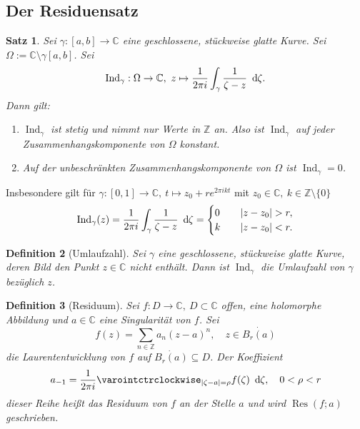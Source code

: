 \documentclass[a4paper,12pt]{article}
\theoremstyle{newthm}
\newtheorem{thm}{Satz}[subsection]
\theoremstyle{newdef}
\newtheorem{defn}[thm]{Definition}
\theoremstyle{newrem}
\newcommand{\Z}{\mathbb{Z}}
\newcommand{\C}{\mathbb{C}}
\renewcommand{\d}{\ \operatorname{d}\hspace{-2px}}
\newcommand{\Ind}[1]{\operatorname{Ind}_{#1}}
\newcommand{\Res}[2]{\operatorname{Res} \left( #1;#2 \right) }
\begin{document}
	
	\subsection{Der Residuensatz}
		
		\begin{thm}
			Sei $\gamma: [a,b] \to \C$ eine geschlossene, stückweise glatte Kurve. Sei $ \Omega := \C \setminus \gamma[a,b] $. Sei 
			$$ \Ind{\gamma}: \Omega \to \C,\ z \mapsto \frac{1}{2\pi i} \int_\gamma \frac{1}{\zeta- z}\d\zeta. $$
			Dann gilt:
			\begin{enumerate}[label={\alph*})]
				\item $\Ind{\gamma}$ ist stetig und nimmt nur Werte in $\Z$ an. Also ist $\Ind{\gamma}$ auf jeder Zusammenhangskomponente von $\Omega$ konstant.
				\item Auf der unbeschränkten Zusammenhangskomponente von $\Omega$ ist $\Ind{\gamma} = 0$.
			\end{enumerate}
		\end{thm}
		
		Insbesondere gilt für $ \gamma:[0,1] \to \C,\ t \mapsto z_0 + re^{2\pi ikt} $ mit $ z_0 \in \C,\ k \in \Z\setminus\{0\} $
		\[ \Ind{\gamma}(z) = \frac{1}{2\pi i} \int_\gamma \frac{1}{\zeta- z}\d\zeta = \begin{cases}
		0 \quad &|z-z_0| > r,\\
		k \quad &|z-z_0| < r.
		\end{cases} \]
			
		\begin{defn}[Umlaufzahl]
			Sei $\gamma$ eine geschlossene, stückweise glatte Kurve, deren Bild den Punkt $z \in \C$ nicht enthält. Dann ist $\Ind{\gamma}$ die \emph{Umlaufzahl} von $\gamma$ bezüglich $z$.
		\end{defn}
		
		\begin{defn}[Residuum]
			Sei $ f: D \to \C,\ D \subset \C $ offen, eine holomorphe Abbildung und $a \in \C$ eine Singularität von $f$. Sei 
			\[ f(z) = \sum_{n \in \Z} a_n(z-a)^n,\quad z \in \dot{B_r(a)} \]
			die Laurententwicklung von $f$ auf $ \dot{B_r(a)} \subseteq D $. Der Koeffizient
			\[ a_{-1} = \frac{1}{2\pi i} \varointctrclockwise_{|\zeta - a| = \rho} f(\zeta)\d\zeta, \quad 0 < \rho < r \]
			dieser Reihe heißt das \emph{Residuum} von $f$ an der Stelle $a$ und wird $\Res{f}{a}$ geschrieben.
		\end{defn}
		
\end{document}
